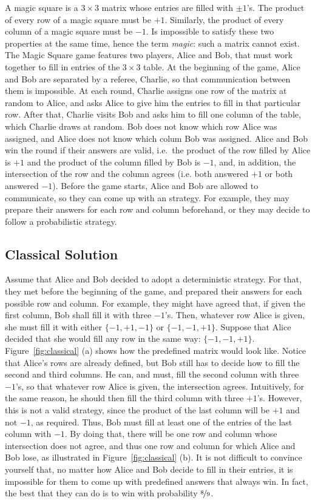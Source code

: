 \documentclass{llncs}
\begin{document}
A magic square is a \(3 \times 3\) matrix whose entries are filled
with \(\pm 1\)'s. The product of every row of a magic square must be
\(+1\). Similarly, the product of every column of a magic square must
be \(-1\). Is impossible to satisfy these two properties at the same
time, hence the term \emph{magic}: such a matrix cannot exist. The
Magic Square game features two players, Alice and Bob, that must work
together to fill in entries of the \(3 \times 3\) table.  At the
beginning of the game, Alice and Bob are separated by a referee,
Charlie, so that communication between them is impossible. At each
round, Charlie assigns one row of the matrix at random to Alice, and
asks Alice to give him the entries to fill in that particular
row. After that, Charlie visits Bob and asks him to fill one column of
the table, which Charlie draws at random.  Bob does not know which row
Alice was assigned, and Alice does not know which colum Bob was
assigned. Alice and Bob win the round if their answers are valid,
i.e.\ the product of the row filled by Alice is \(+1\) and the product
of the column filled by Bob is \(-1\), and, in addition, the
intersection of the row and the column agrees (i.e. both answered
\(+1\) or both answered \(-1\)). Before the game starts, Alice and Bob
are allowed to communicate, so they can come up with an strategy.  For
example, they may prepare their answers for each row and column
beforehand, or they may decide to follow a probabilistic strategy.

\subsection{Classical Solution}
\label{sec:classic-sol}

Assume that Alice and Bob decided to adopt a deterministic strategy.
For that, they met before the beginning of the game, and prepared
their answers for each possible row and column. For example, they
might have agreed that, if given the first column, Bob shall fill it
with three \(-1\)'s. Then, whatever row Alice is given, she must fill
it with either \(\{-1, +1, -1\}\) or \(\{-1, -1, +1\}\). Suppose that
Alice decided that she would fill any row in the same way:
\(\{-1, -1, +1\}\). Figure~\ref{fig:classical} (a) shows how the
predefined matrix would look like. Notice that Alice's rows are
already defined, but Bob still has to decide how to fill the second
and third columns. He can, and must, fill the second column with three
\(-1\)'s, so that whatever row Alice is given, the intersection
agrees. Intuitively, for the same reason, he should then fill the
third column with three \(+1\)'s. However, this is not a valid
strategy, since the product of the last column will be \(+1\) and not
\(-1\), as required. Thus, Bob must fill at least one of the
entries of the last column with \(-1\).  By doing that, there will be
one row and column whose intersection does not agree, and thus one row
and column for which Alice and Bob lose, as illustrated in
Figure~\ref{fig:classical} (b). It is not difficult to convince yourself that,
no matter how Alice and Bob decide to fill in their entries, it is impossible
for them to come up with predefined answers that always win. In fact,
the best that they can do is to win with probability \(\nicefrac{8}{9}\).
\end{document}
